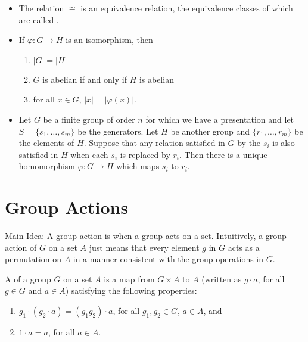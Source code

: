 \begin{itemize}
	\item The relation $\cong$ is an equivalence relation, the 
	equivalence classes of which are called .

	\item If $\varphi:G \to H$ is an isomorphism, then
	\begin{enumerate}
		\item $|G| = |H|$
		
		\item $G$ is abelian if and only if $H$ is abelian
		
		\item for all $x \in G$, $|x| = |\varphi(x)|$.
	\end{enumerate}

	\item Let $G$ be a finite group of order $n$ for which we have 
	a presentation and let $S = \{ s_1, \dots, s_m \}$ be the 
	generators. Let $H$ be another group and $\{ r_1, \dots, r_m 
	\}$ be the elements of $H$. Suppose that any relation satisfied 
	in $G$ by the $s_i$ is also satisfied in $H$ when each $s_i$ is 
	replaced by $r_i$. Then there is a unique homomorphism 
	$\varphi:G \to H$ which maps $s_i$ to $r_i$.
\end{itemize}


\newpage

\section{Group Actions}

Main Idea: A group action is when a group acts on a set. 
Intuitively, a group action of $G$ on a set $A$ just means that 
every element $g$ in $G$ acts as a permutation on $A$ in a manner 
consistent with the group operations in $G$.

\begin{definition}
	A  of a group $G$ on a set $A$ is a map from 
	$G \times A$ to $A$ (written as $g \cdot a$, for all $g \in G$ 
	and $a \in A$) satisfying the following properties:
	\begin{enumerate}
		\item $g_1 \cdot (g_2 \cdot a) = (g_1g_2) \cdot a$, for all 
		$g_1, g_2 \in G$, $a \in A$, and
		
		\item $1 \cdot a = a$, for all $a \in A$.
	\end{enumerate}
\end{definition}

